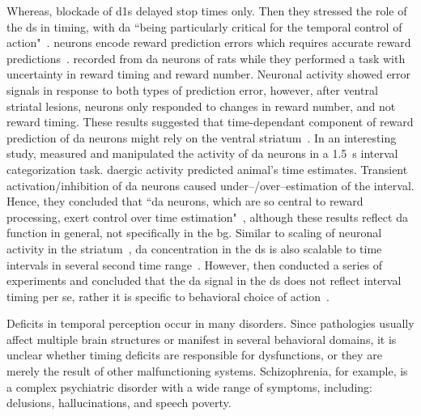 Whereas, blockade of \glspl{d1} delayed stop times only.
Then they stressed the role of the \gls{ds} in timing, with \gls{da} ``being particularly critical for the temporal control of action"~\cite{DeCorte2019}.
 neurons encode reward prediction errors which requires accurate reward predictions~\cite[see][]{Berke2018NN}.
 recorded from \gls{da} neurons of rats while they performed a task with uncertainty in reward timing and reward number.
Neuronal activity showed error signals in response to both types of prediction error, however, after ventral striatal lesions, neurons only responded to changes in reward number, and not reward timing.
These results suggested that time-dependant component of reward prediction of \gls{da} neurons might rely on the ventral striatum~\cite{Takahashi2016}.
In an interesting study,  measured and manipulated the activity of \gls{da} neurons in a 1.5~s interval categorization task.
\Gls{da}ergic activity predicted animal's time estimates.
Transient activation/inhibition of \gls{da} neurons caused under--/over--estimation of the interval.
Hence, they concluded that ``\gls{da} neurons, which are so central to reward processing, exert control over time estimation"~\cite{Paton2016Sci}, although these results reflect \gls{da} function in general, not specifically in the \gls{bg}.
Similar to scaling of neuronal activity in the striatum~\cite{Mello2015}, \gls{da} concentration in the \gls{ds} is also scalable to time intervals in several second time range~\cite{Howard2017}.
However, \citeauthor{Howard2017} then conducted a series of experiments and concluded that the \gls{da} signal in the \gls{ds} does not reflect interval timing per se, rather it is specific to behavioral choice of action~\cite{Howard2017}.
\par
Deficits in temporal perception occur in many disorders.
Since pathologies usually affect multiple brain structures or manifest in several behavioral domains, it is unclear whether timing deficits are responsible for dysfunctions, or they are merely the result of other malfunctioning systems.
Schizophrenia, for example, is a complex psychiatric disorder with a wide range of symptoms, including: delusions, hallucinations, and speech poverty.
